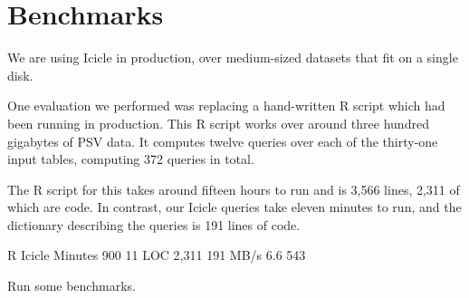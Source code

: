 \section{Benchmarks}
\label{s:Benchmarks}

We are using Icicle in production, over medium-sized datasets that fit on a single disk.

One evaluation we performed was replacing a hand-written R script which had been running in production.
This R script works over around three hundred gigabytes of PSV data.
It computes twelve queries over each of the thirty-one input tables, computing 372 queries in total.

The R script for this takes around fifteen hours to run and is 3,566 lines, 2,311 of which are code.
In contrast, our Icicle queries take eleven minutes to run, and the dictionary describing the queries is 191 lines of code.

\begin{code}
          R       Icicle
Minutes   900         11
LOC       2,311      191
MB/s      6.6        543
\end{code}


Run some benchmarks.


